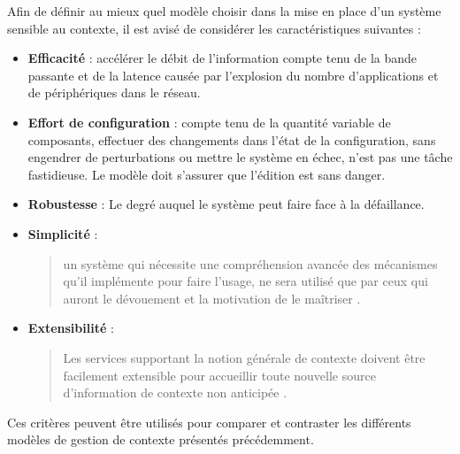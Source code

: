 Afin de définir au mieux quel modèle choisir dans la mise en place d'un système
sensible au contexte, il est avisé de considérer les caractéristiques suivantes
:

\begin{itemize}
    \item \textbf{Efficacité} : 
        accélérer le débit de l'information compte tenu de la bande passante
        et de la latence causée par l'explosion du nombre d'applications et
        de périphériques dans le réseau.
    \item \textbf{Effort de configuration} : 
        compte tenu de la quantité variable de composants, effectuer des
        changements dans l'état de la configuration, sans engendrer de
        perturbations ou mettre le système en échec, n'est pas une tâche
        fastidieuse. Le modèle doit s'assurer que l'édition est sans danger.
    \item \textbf{Robustesse} : 
        Le degré auquel le système peut faire face à la défaillance.
    \item \textbf{Simplicité} : 
        \begin{quotation}
            un système qui nécessite une compréhension avancée des mécanismes
            qu'il implémente pour faire l'usage, ne sera utilisé que par ceux
            qui auront le dévouement et la motivation de le maîtriser
            \cite{winograd_architectures_2001}.
        \end{quotation}
    \item \textbf{Extensibilité} : 
        \begin{quotation}
            Les services supportant la notion générale de contexte doivent
            être facilement extensible pour accueillir toute nouvelle source
            d'information de contexte non anticipée \cite{ebling_issues_2001}.
        \end{quotation}
\end{itemize}

Ces critères peuvent être utilisés pour comparer et contraster les différents
modèles de gestion de contexte présentés précédemment.

